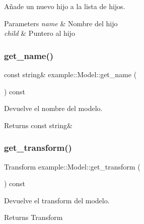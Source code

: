 Añade un nuevo hijo a la lista de hijos. 


\begin{DoxyParams}{Parameters}
{\em name} & Nombre del hijo \\
\hline
{\em child} & Puntero al hijo \\
\hline
\end{DoxyParams}
\mbox{\label{classexample_1_1_model_aaeab3d2650177e97847b11684c7575f4}} 
\subsubsection{\texorpdfstring{get\_name()}{get\_name()}}
{\footnotesize\ttfamily const string\& example\+::\+Model\+::get\+\_\+name (\begin{DoxyParamCaption}{ }\end{DoxyParamCaption}) const\hspace{0.3cm}{\ttfamily [inline]}}



Devuelve el nombre del modelo. 

\begin{DoxyReturn}{Returns}
const string\& 
\end{DoxyReturn}
\mbox{\label{classexample_1_1_model_a18630b95037b7e762d87059f5264e83c}} 
\subsubsection{\texorpdfstring{get\_transform()}{get\_transform()}}
{\footnotesize\ttfamily Transform example\+::\+Model\+::get\+\_\+transform (\begin{DoxyParamCaption}{ }\end{DoxyParamCaption}) const\hspace{0.3cm}{\ttfamily [inline]}}



Devuelve el transform del modelo. 

\begin{DoxyReturn}{Returns}
Transform 
\end{DoxyReturn}
\mbox{\label{classexample_1_1_model_a5b038b07484e2b74bc06727e81eb49eb}} 

